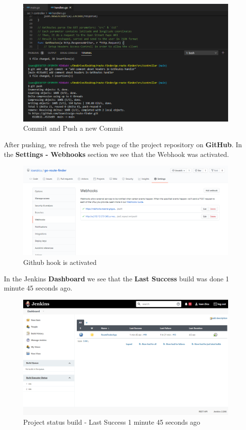 \documentclass[12pt,a4paper,twoside]{article}
\begin{document}
\begin{figure}[H]
    \centering
        \includegraphics[width=15cm]{images-aws/47-small-commit-after-fixed-branches.png}
        \caption{Commit and Push a new Commit}
\end{figure}


After pushing, we refresh the web page of the project repository on \textbf{GitHub}. In the \textbf{Settings - Webhooks} section we see that the Webhook was activated.


\begin{figure}[H]
    \centering
        \includegraphics[width=15cm]{images-aws/48-successfull-push-webhook.png}
        \caption{Github hook is activated}
\end{figure}


In the Jenkins \textbf{Dashboard} we see that the \textbf{Last Success} build was done 1 minute 45 seconds ago.


\begin{figure}[h!]
    \centering
        \includegraphics[width=15cm]{images-aws/49-triggered-push.png}
        \caption{Project status build - Last Success 1 minute 45 seconds ago}
\end{figure}
\end{document}
